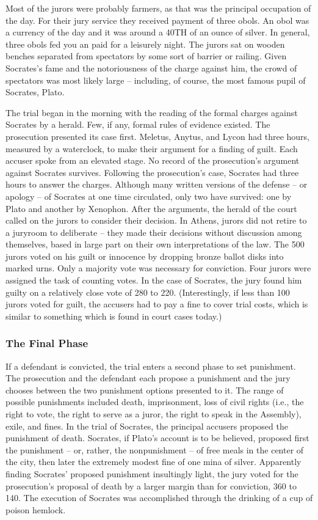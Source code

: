 Most of the jurors were probably farmers, as that was the principal occupation of the day. For their jury service they received payment of three obols. An obol was a currency of the day and it was around a 40TH of an ounce of silver. In general, three obols fed you an paid for a leisurely night. The jurors sat on wooden benches separated from spectators by some sort of barrier or railing. Given Socrates's fame and the notoriousness of the charge against him, the crowd of spectators was most likely large – including, of course, the most famous pupil of Socrates, Plato.

The trial began in the morning with the reading of the formal charges against Socrates by a herald. Few, if any, formal rules of evidence existed. The prosecution presented its case first. Meletus, Anytus, and Lycon had three hours, measured by a waterclock, to make their argument for a finding of guilt. Each accuser spoke from an elevated stage. No record of the prosecution's argument against Socrates survives. Following the prosecution's case, Socrates had three hours to answer the charges. Although many written versions of the defense – or apology – of Socrates at one time circulated, only two have survived: one by Plato and another by Xenophon. After the arguments, the herald of the court called on the jurors to consider their decision. In Athens, jurors did not retire to a juryroom to deliberate – they made their decisions without discussion among themselves, based in large part on their own interpretations of the law. The 500 jurors voted on his guilt or innocence by dropping bronze ballot disks into marked urns. Only a majority vote was necessary for conviction. Four jurors were assigned the task of counting votes. In the case of Socrates, the jury found him guilty on a relatively close vote of 280 to 220. (Interestingly, if less than 100 jurors voted for guilt, the accusers had to pay a fine to cover trial costs, which is similar to something which is found in court cases today.)
\subsubsection{The Final Phase}

If a defendant is convicted, the trial enters a second phase to set punishment. The prosecution and the defendant each propose a punishment and the jury chooses between the two punishment options presented to it. The range of possible punishments included death, imprisonment, loss of civil rights (i.e., the right to vote, the right to serve as a juror, the right to speak in the Assembly), exile, and fines. In the trial of Socrates, the principal accusers proposed the punishment of death. Socrates, if Plato's account is to be believed, proposed first the punishment – or, rather, the nonpunishment – of free meals in the center of the city, then later the extremely modest fine of one mina of silver. Apparently finding Socrates' proposed punishment insultingly light, the jury voted for the prosecution's proposal of death by a larger margin than for conviction, 360 to 140. The execution of Socrates was accomplished through the drinking of a cup of poison hemlock.

